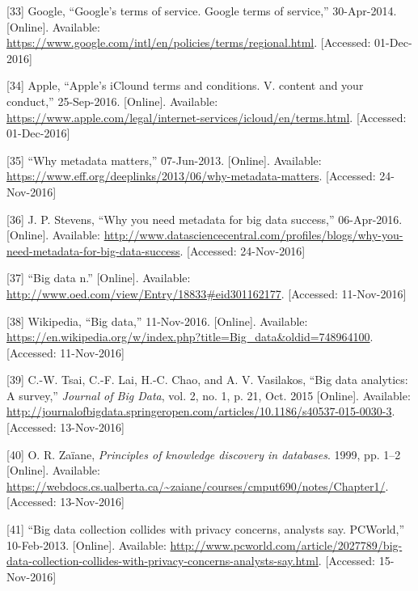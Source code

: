 \documentclass[12pt,english,a4paper,titlepage,cleardoublepage=empty,dottedtoc]{report}
\begin{document}
\hypertarget{ref-web_2016_google_terms-of-service}{}
{[}33{]} Google, ``Google's terms of service. Google terms of service,''
30-Apr-2014. {[}Online{]}. Available:
\url{https://www.google.com/intl/en/policies/terms/regional.html}.
{[}Accessed: 01-Dec-2016{]}

\hypertarget{ref-web_2016_apple-icloud_terms-of-service}{}
{[}34{]} Apple, ``Apple's iClound terms and conditions. V. content and
your conduct,'' 25-Sep-2016. {[}Online{]}. Available:
\url{https://www.apple.com/legal/internet-services/icloud/en/terms.html}.
{[}Accessed: 01-Dec-2016{]}

\hypertarget{ref-web_2013_why-metadata-matters}{}
{[}35{]} ``Why metadata matters,'' 07-Jun-2013. {[}Online{]}. Available:
\url{https://www.eff.org/deeplinks/2013/06/why-metadata-matters}.
{[}Accessed: 24-Nov-2016{]}

\hypertarget{ref-web_2016_why-you-need-metadata-for-big-data-to-success}{}
{[}36{]} J. P. Stevens, ``Why you need metadata for big data success,''
06-Apr-2016. {[}Online{]}. Available:
\url{http://www.datasciencecentral.com/profiles/blogs/why-you-need-metadata-for-big-data-success}.
{[}Accessed: 24-Nov-2016{]}

\hypertarget{ref-web_2016_oxford_definition_big-data}{}
{[}37{]} ``Big data n.'' {[}Online{]}. Available:
\url{http://www.oed.com/view/Entry/18833\#eid301162177}. {[}Accessed:
11-Nov-2016{]}

\hypertarget{ref-web_2016_wikipedia_definition_big-data}{}
{[}38{]} Wikipedia, ``Big data,'' 11-Nov-2016. {[}Online{]}. Available:
\url{https://en.wikipedia.org/w/index.php?title=Big_data\&oldid=748964100}.
{[}Accessed: 11-Nov-2016{]}

\hypertarget{ref-paper_2015_big-data-analytics_a-survey}{}
{[}39{]} C.-W. Tsai, C.-F. Lai, H.-C. Chao, and A. V. Vasilakos, ``Big
data analytics: A survey,'' \emph{Journal of Big Data}, vol. 2, no. 1,
p. 21, Oct. 2015 {[}Online{]}. Available:
\url{http://journalofbigdata.springeropen.com/articles/10.1186/s40537-015-0030-3}.
{[}Accessed: 13-Nov-2016{]}

\hypertarget{ref-book-chapter_1999_Principles-of-knowledge-discovery-in-databases_introduction-to-data-mining}{}
{[}40{]} O. R. Zaïane, \emph{Principles of knowledge discovery in
databases}. 1999, pp. 1--2 {[}Online{]}. Available:
\url{https://webdocs.cs.ualberta.ca/~zaiane/courses/cmput690/notes/Chapter1/}.
{[}Accessed: 13-Nov-2016{]}

\hypertarget{ref-web_2013_big-data-collection-collides-with-privacy-concerns}{}
{[}41{]} ``Big data collection collides with privacy concerns, analysts
say. PCWorld,'' 10-Feb-2013. {[}Online{]}. Available:
\url{http://www.pcworld.com/article/2027789/big-data-collection-collides-with-privacy-concerns-analysts-say.html}.
{[}Accessed: 15-Nov-2016{]}
\end{document}
